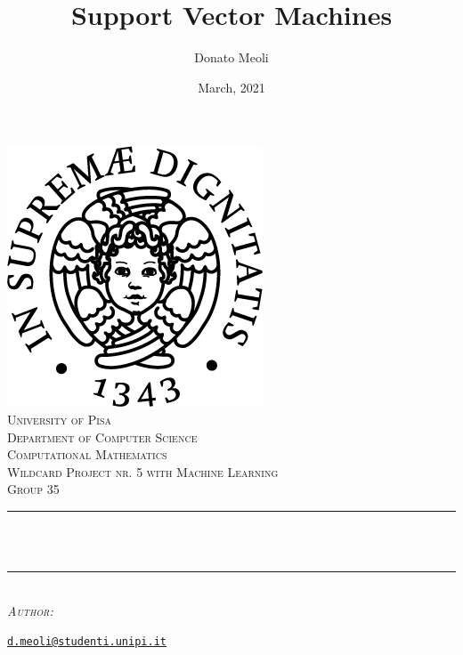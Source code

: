 \documentclass[10pt]{article}
\title{Support Vector Machines}
\author{Donato Meoli}
\date{March, 2021}
\makeatletter
\theoremstyle{plain}
\theoremstyle{definition}
\let\thetitle\@title
\let\theauthor\@author
\let\thedate\@date
\makeatother
\begin{document}
\begin{titlepage}
	\centering
    \vspace*{0.5 cm}
    \includegraphics[scale=0.5]{img/unipi}\\[1.0 cm]
    \textsc{\LARGE University of Pisa}\\[0.5 cm]
    \textsc{\Large Department of Computer Science}\\[1.5 cm]
	\textsc{\large Computational Mathematics \\ Wildcard Project nr. 5 with Machine Learning \\ Group 35}\\[0.5 cm]
	\rule{\linewidth}{0.2 mm} \\[0.4 cm]
	{ \huge \bfseries \thetitle}\\
	\rule{\linewidth}{0.2 mm} \\[1.5 cm]
	\centering \textsc{\large \emph{Author:}}\\[0.5 cm]
	\begin{minipage}{0.4\textwidth}
		\begin{center} \large
			\textbf{\theauthor}
			\texttt{\href{mailto::d.meoli@studenti.unipi.it}{d.meoli@studenti.unipi.it}}
		\end{center}
		\end{minipage}~
		\begin{minipage}{0.4\textwidth}
	\end{minipage}\\[2 cm]
	{\large \thedate}\\[2 cm]
	\vfill
\end{titlepage}

\tableofcontents

\pagebreak

\listoffigures

\pagebreak
\end{document}
